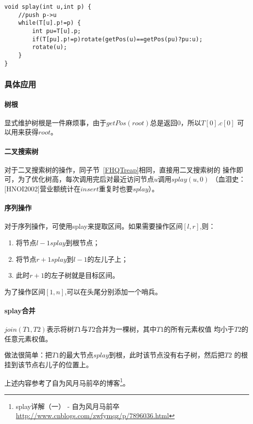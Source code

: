\begin{lstlisting}[title=splay]
void splay(int u,int p) {
    //push p->u
    while(T[u].p!=p) {
        int pu=T[u].p;
        if(T[pu].p!=p)rotate(getPos(u)==getPos(pu)?pu:u);
        rotate(u);
    }
}
\end{lstlisting}

\subsubsection{具体应用}

\paragraph{树根}

显式维护树根是一件麻烦事，由于$getPos(root)$总是返回0，所以$T[0].c[0]$
可以用来获得$root$。

\paragraph{二叉搜索树}

对于二叉搜索树的操作，同子节~\ref{FHQTreap}相同，直接用二叉搜索树的
操作即可，为了优化树高，每次调用完后对最近访问节点$u$调用$splay(u,0)$
（血泪史：[HNOI2002]营业额统计在$insert$重复时也要$splay$）。

\paragraph{序列操作}

对于序列操作，可使用splay来提取区间。如果需要操作区间$[l,r]$,则：

\begin{enumerate}
	\item 将节点$l-1 splay$到根节点；
	\item 将节点$r+1 splay$到$l-1$的左儿子上；
	\item 此时$r+1$的左子树就是目标区间。
\end{enumerate}

为了操作区间$[1,n]$,可以在头尾分别添加一个哨兵。

\paragraph{splay合并}

$join(T1,T2)$表示将树$T1$与$T2$合并为一棵树，其中$T1$的所有元素权值
均小于$T2$的任意元素权值。

做法很简单：把$T1$的最大节点$splay$到根，此时该节点没有右子树，然后把$T2$
的根挂到该节点右儿子的位置上。

上述内容参考了自为风月马前卒的博客\footnote{splay详解（一） - 自为风月马前卒
	\url{http://www.cnblogs.com/zwfymqz/p/7896036.html}}。
